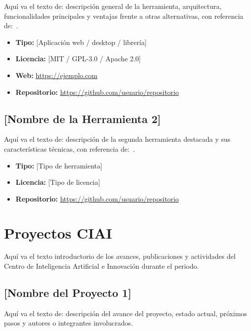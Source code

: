 \documentclass[conference]{IEEEtran}
\begin{document}
Aquí va el texto de: descripción general de la herramienta, arquitectura,
funcionalidades principales y ventajas frente a otras alternativas, con
referencia de:~\cite{ejemplo_referencia}.

\begin{itemize}
  \item \textbf{Tipo:} [Aplicación web / desktop / librería]
  \item \textbf{Licencia:} [MIT / GPL-3.0 / Apache 2.0]
  \item \textbf{Web:} \url{https://ejemplo.com}
  \item \textbf{Repositorio:} \url{https://github.com/usuario/repositorio}
\end{itemize}

\subsection{[Nombre de la Herramienta 2]}

Aquí va el texto de: descripción de la segunda herramienta destacada y sus
características técnicas, con referencia de:~\cite{ejemplo_referencia}.

\begin{itemize}
  \item \textbf{Tipo:} [Tipo de herramienta]
  \item \textbf{Licencia:} [Tipo de licencia]
  \item \textbf{Repositorio:} \url{https://github.com/usuario/repositorio}
\end{itemize}

\section{Proyectos CIAI}

Aquí va el texto introductorio de los avances, publicaciones y actividades
del Centro de Inteligencia Artificial e Innovación durante el periodo.

\subsection{[Nombre del Proyecto 1]}

Aquí va el texto de: descripción del avance del proyecto, estado actual,
próximos pasos y autores o integrantes involucrados.
\end{document}

